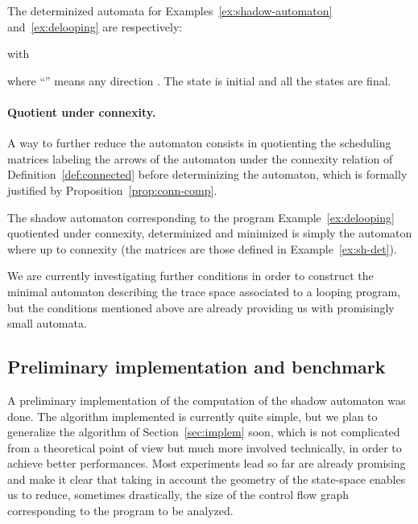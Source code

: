 \documentclass[orivec]{llncs} \usepackage[T1]{fontenc}
\begin{document}
\begin{example}
  \label{ex:sh-det}
  The determinized automata for Examples~\ref{ex:shadow-automaton}
  and~\ref{ex:delooping} are respectively:
  
  with
  \vspace{-2ex}
  
  where ``'' means any direction . The state  is initial and all the
  states are final.
\end{example}












\paragraph{Quotient under connexity.}
A way to further reduce the automaton consists in quotienting the scheduling
matrices labeling the arrows of the automaton under the connexity relation of
Definition~\ref{def:connected} before determinizing the automaton, which is
formally justified by Proposition~\ref{prop:conn-comp}.

\begin{example}
  The shadow automaton corresponding to the program Example~\ref{ex:delooping}
  quotiented under connexity, determinized and minimized is simply the automaton
   where  up to connexity (the
  matrices  are those defined in Example~\ref{ex:sh-det}).
\end{example}

We are currently investigating further conditions in order to construct the
minimal automaton describing the trace space associated to a looping program,
but the conditions mentioned above are already providing us with promisingly
small automata.

\subsection{Preliminary implementation and benchmark}
\label{sec:loops-implem}
A preliminary implementation of the computation of the shadow automaton was
done. The algorithm implemented is currently quite simple, but we plan to
generalize the algorithm of Section~\ref{sec:implem} soon, which is not
complicated from a theoretical point of view but much more involved technically,
in order to achieve better performances. Most experiments lead so far are
already promising and make it clear that taking in account the geometry of the
state-space enables us to reduce, sometimes drastically, the size of the control
flow graph corresponding to the program to be analyzed.
\end{document}
